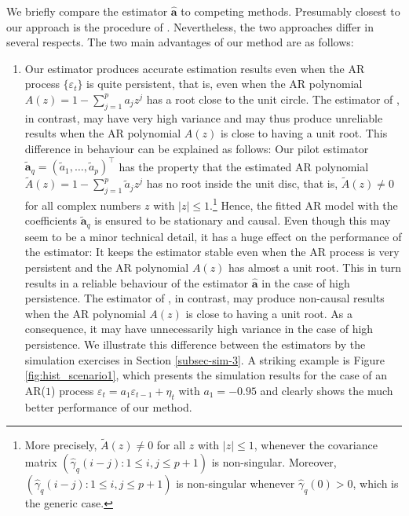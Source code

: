 We briefly compare the estimator $\widehat{\boldsymbol{a}}$ to competing methods. Presumably closest to our approach is the procedure of \cite{Hall2003}. Nevertheless, the two approaches differ in several respects. The two main advantages of our method are as follows: 
\begin{enumerate}[label=(\alph*),leftmargin=0.7cm]
\item Our estimator produces accurate estimation results even when the AR process $\{\varepsilon_t\}$ is quite persistent, that is, even when the AR polynomial $A(z) = 1 - \sum_{j=1}^p a_j z^j$ has a root close to the unit circle. The estimator of \cite{Hall2003}, in contrast, may have very high variance and may thus produce unreliable results when the AR polynomial $A(z)$ is close to having a unit root. This difference in behaviour can be explained as follows: Our pilot estimator $\widetilde{\boldsymbol{a}}_q = (\widetilde{a}_1,\ldots,\widetilde{a}_p)^\top$ has the property that the estimated AR polynomial $\widetilde{A}(z) = 1 - \sum_{j=1}^p \widetilde{a}_j z^j$ has no root inside the unit disc, that is, $\widetilde{A}(z) \ne 0$ for all complex numbers $z$ with $|z| \le 1$.\footnote{More precisely, $\widetilde{A}(z) \ne 0$ for all $z$ with $|z| \le 1$, whenever the covariance matrix $(\widehat{\gamma}_q(i-j): 1 \le i,j \le p+1)$ is non-singular. Moreover, $(\widehat{\gamma}_q(i-j): 1 \le i,j \le p+1)$ is non-singular whenever $\widehat{\gamma}_q(0) > 0$, which is the generic case.} Hence, the fitted AR model with the coefficients $\widetilde{\boldsymbol{a}}_q$ is ensured to be stationary and causal. Even though this may seem to be a minor technical detail, it has a huge effect on the performance of the estimator: It keeps the estimator stable even when the AR process is very persistent and the AR polynomial $A(z)$ has almost a unit root. This in turn results in a reliable behaviour of the estimator $\widehat{\boldsymbol{a}}$ in the case of high persistence. The estimator of \cite{Hall2003}, in contrast, may produce non-causal results when the AR polynomial $A(z)$ is close to having a unit root. As a consequence, it may have unnecessarily high variance in the case of high persistence. We illustrate this difference between the estimators by the simulation exercises in Section \ref{subsec-sim-3}. A striking example is Figure \ref{fig:hist_scenario1}, which presents the simulation results for the case of an AR($1$) process $\varepsilon_t = a_1 \varepsilon_{t-1} + \eta_t$ with $a_1 = -0.95$ and clearly shows the much better performance of our method.  

\end{enumerate}
